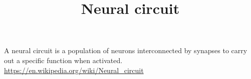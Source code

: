 \documentclass[a4paper]{article}
\title{Neural circuit}
\date{}
\begin{document}
    \maketitle
    A neural circuit is a population of neurons interconnected by synapses to carry out a specific function when activated.
    \url{https://en.wikipedia.org/wiki/Neural_circuit}
\end{document}
